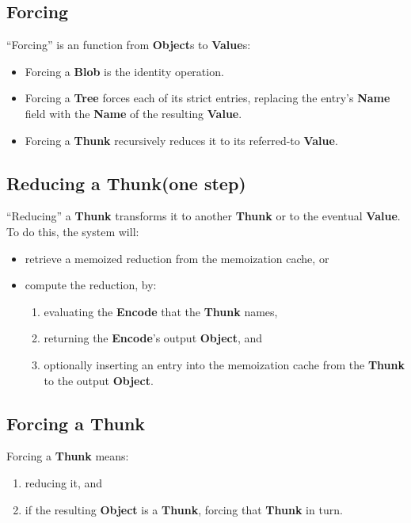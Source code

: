 \documentclass{article}
\newcommand{\blob}{\textbf{Blob}\xspace}
\newcommand{\valuex}{\textbf{Value}\xspace}
\newcommand{\valuexs}{\textbf{Value}s\xspace}
\newcommand{\object}{\textbf{Object}\xspace}
\newcommand{\objects}{\textbf{Object}s\xspace}
\newcommand{\encode}{\textbf{Encode}\xspace}
\newcommand{\thunk}{\textbf{Thunk}\xspace}
\newcommand{\name}{\textbf{Name}\xspace}
\newcommand{\tree}{\textbf{Tree}\xspace}
\begin{document}
\subsection{Forcing}

``Forcing'' is an function from \objects to \valuexs:

\begin{itemize}[itemsep=0pt]
\item Forcing a \blob is the identity operation.

\item Forcing a \tree forces each of its strict entries, replacing the
  entry's \name field with the \name of the resulting \valuex.

\item Forcing a \thunk recursively reduces it to its referred-to \valuex.
\end{itemize}

\subsection{Reducing a \thunk (one step)}

``Reducing'' a \thunk transforms it to another \thunk or to the
eventual \valuex. To do this, the system will:
\begin{itemize}[itemsep=0pt]
\item retrieve a memoized reduction from the memoization cache, or
\item compute the reduction, by:
  \begin{enumerate}[topsep=0pt, itemsep=0pt]
  \item evaluating the \encode that the \thunk names,
  \item returning the \encode's output \object, and
  \item optionally inserting an entry into the memoization cache from the \thunk to the output \object.
  \end{enumerate}
\end{itemize}

\subsection{Forcing a \thunk}

Forcing a \thunk means:
\begin{enumerate}[itemsep=0pt]
\item reducing it, and
\item if the resulting \object is a \thunk, forcing that \thunk in turn.
\end{enumerate}
\end{document}
